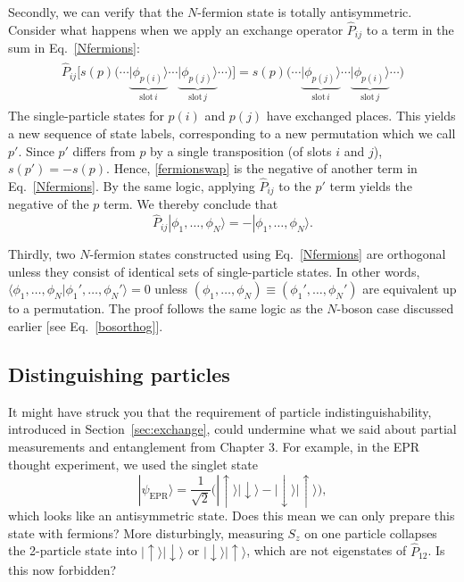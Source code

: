 \documentclass[prx,12pt]{revtex4-2}
\begin{document}
Secondly, we can verify that the $N$-fermion state is totally
antisymmetric.  Consider what happens when we apply an exchange
operator $\hat{P}_{ij}$ to a term in the sum in Eq.~\eqref{Nfermions}:
\begin{align}
  \begin{aligned}
    \hat{P}_{ij} \Big[s(p)\big( \cdots
      \underbrace{|\phi_{p(i)}\rangle}_{\textrm{slot}\,i} \cdots
      \underbrace{|\phi_{p(j)}\rangle}_{\textrm{slot}\,j} \cdots \big)\Big]
    = s(p)\big( \cdots
      \underbrace{|\phi_{p(j)}\rangle}_{\textrm{slot}\,i} \cdots
      \underbrace{|\phi_{p(i)}\rangle}_{\textrm{slot}\,j} \cdots \big)
  \end{aligned}
  \label{fermionswap}
\end{align}
The single-particle states for $p(i)$ and $p(j)$ have exchanged
places.  This yields a new sequence of state labels, corresponding to
a new permutation which we call $p'$.  Since $p'$ differs from $p$ by
a single transposition (of slots $i$ and $j$), $s(p') = - s(p)$.
Hence, \eqref{fermionswap} is the negative of another term in
Eq.~\eqref{Nfermions}.  By the same logic, applying $\hat{P}_{ij}$ to
the $p'$ term yields the negative of the $p$ term.  We thereby
conclude that
\begin{equation}
  \hat{P}_{ij} |\phi_1,\dots,\phi_N\rangle = - |\phi_1,\dots,\phi_N\rangle.
\end{equation}

Thirdly, two $N$-fermion states constructed using
Eq.~\eqref{Nfermions} are orthogonal unless they consist of identical
sets of single-particle states.  In other words, $\langle \phi_1,
\dots, \phi_N| \phi_1', \dots, \phi_N'\rangle = 0$ unless $(\phi_1,
\dots, \phi_N) \equiv (\phi_1', \dots, \phi_N')$ are equivalent up to
a permutation.  The proof follows the same logic as the $N$-boson case
discussed earlier [see Eq.~\eqref{bosorthog}].

\subsection{Distinguishing particles}
\label{sec:distinguishability}

It might have struck you that the requirement of particle
indistinguishability, introduced in Section~\ref{sec:exchange}, could
undermine what we said about partial measurements and entanglement
from Chapter 3.  For example, in the EPR thought experiment, we used
the singlet state
\begin{equation}
  |\psi_{\mathrm{EPR}}\rangle = \frac{1}{\sqrt{2}} \Big(|\!\uparrow\rangle |\!\downarrow\rangle
  - |\!\downarrow\rangle |\!\uparrow\rangle \Big),
  \label{EPR}
\end{equation}
which looks like an antisymmetric state.  Does this mean we can only
prepare this state with fermions?  More disturbingly, measuring
${S}_z$ on one particle collapses the 2-particle state into
$|\!\uparrow\rangle |\!\downarrow\rangle$ or $|\!\downarrow\rangle
|\!\uparrow\rangle$, which are not eigenstates of $\hat{P}_{12}$.  Is
this now forbidden?
\end{document}
